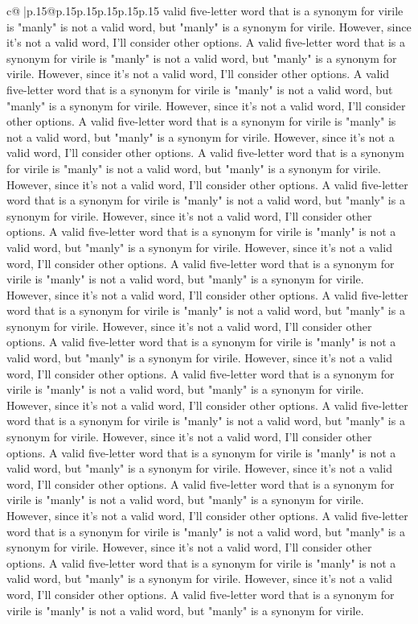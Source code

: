 \documentclass{article}
\begin{document}
{\begin{supertabular}{c@{$\;$}|p{.15\linewidth}@{}p{.15\linewidth}p{.15\linewidth}p{.15\linewidth}p{.15\linewidth}p{.15\linewidth}}
{{{valid five{-}letter word that is a synonym for virile is "manly" is not a valid word, but "manly" is a synonym for virile. However, since it's not a valid word, I'll consider other options. A valid five{-}letter word that is a synonym for virile is "manly" is not a valid word, but "manly" is a synonym for virile. However, since it's not a valid word, I'll consider other options. A valid five{-}letter word that is a synonym for virile is "manly" is not a valid word, but "manly" is a synonym for virile. However, since it's not a valid word, I'll consider other options. A valid five{-}letter word that is a synonym for virile is "manly" is not a valid word, but "manly" is a synonym for virile. However, since it's not a valid word, I'll consider other options. A valid five{-}letter word that is a synonym for virile is "manly" is not a valid word, but "manly" is a synonym for virile. However, since it's not a valid word, I'll consider other options. A valid five{-}letter word that is a synonym for virile is "manly" is not a valid word, but "manly" is a synonym for virile. However, since it's not a valid word, I'll consider other options. A valid five{-}letter word that is a synonym for virile is "manly" is not a valid word, but "manly" is a synonym for virile. However, since it's not a valid word, I'll consider other options. A valid five{-}letter word that is a synonym for virile is "manly" is not a valid word, but "manly" is a synonym for virile. However, since it's not a valid word, I'll consider other options. A valid five{-}letter word that is a synonym for virile is "manly" is not a valid word, but "manly" is a synonym for virile. However, since it's not a valid word, I'll consider other options. A valid five{-}letter word that is a synonym for virile is "manly" is not a valid word, but "manly" is a synonym for virile. However, since it's not a valid word, I'll consider other options. A valid five{-}letter word that is a synonym for virile is "manly" is not a valid word, but "manly" is a synonym for virile. However, since it's not a valid word, I'll consider other options. A valid five{-}letter word that is a synonym for virile is "manly" is not a valid word, but "manly" is a synonym for virile. However, since it's not a valid word, I'll consider other options. A valid five{-}letter word that is a synonym for virile is "manly" is not a valid word, but "manly" is a synonym for virile. However, since it's not a valid word, I'll consider other options. A valid five{-}letter word that is a synonym for virile is "manly" is not a valid word, but "manly" is a synonym for virile. However, since it's not a valid word, I'll consider other options. A valid five{-}letter word that is a synonym for virile is "manly" is not a valid word, but "manly" is a synonym for virile. However, since it's not a valid word, I'll consider other options. A valid five{-}letter word that is a synonym for virile is "manly" is not a valid word, but "manly" is a synonym for virile. However, since it's not a valid word, I'll consider other options. A valid five{-}letter word that is a synonym for virile is "manly" is not a valid word, but "manly" is a synonym for virile. }}}
\end{supertabular}}
\end{document}
